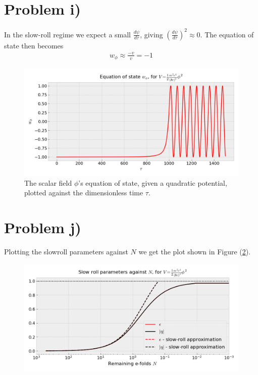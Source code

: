 \documentclass[reprint,english,notitlepage]{revtex4-1}  %
\numberwithin{equation}{section}
\begin{document}
\section{Problem i)}
In the slow-roll regime we expect a small $\frac{d\psi}{d\tau}$, giving
$\left(\frac{d\psi}{d\tau}\right)^2 \approx 0$. The equation of state then
becomes
\begin{align}
	w_\phi \approx \frac{-v}{v} = -1
\end{align}

\begin{figure}[h!]
	\includegraphics[width=\linewidth]{QuadraticPotential_field-eos.png}
	\caption{The scalar field $\phi$'s equation of state, given a quadratic
	potential, plotted against the dimensionless time $\tau$.}
	\label{}
\end{figure}

\section{Problem j)}
Plotting the slowroll parameters against $N$ we get the plot shown in Figure
(\ref{fig:quadratic_slowroll-N}).
\begin{figure}[h!]
	\includegraphics[width=\linewidth]{QuadraticPotential_slowroll-N.png}
	\caption{}
	\label{fig:quadratic_slowroll-N}
\end{figure}
\end{document}
